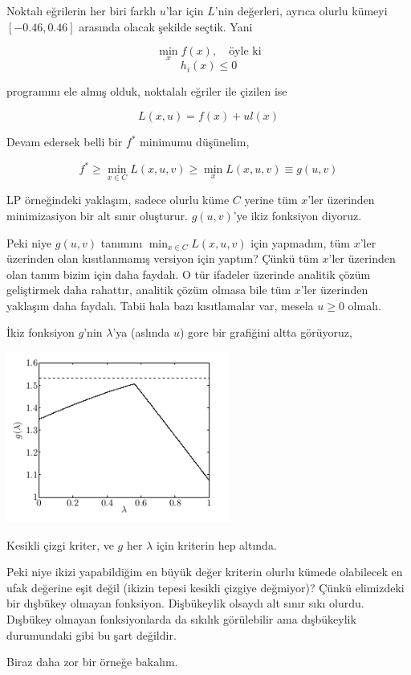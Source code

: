 \documentclass[12pt,fleqn]{article}\usepackage{../../common}
\begin{document}
Noktalı eğrilerin her biri farklı $u$'lar için $L$'nin değerleri, ayrıca
olurlu kümeyi $[-0.46,0.46]$ arasında olacak şekilde seçtik. Yani 

$$
\min_{x} f(x), \quad \textrm{öyle ki}
$$
$$
h_i(x) \le 0
$$

programını ele almış olduk, noktalalı eğriler ile çizilen ise 

$$
L(x,u) = f(x) + u l(x)
$$

Devam edersek belli bir $f^*$ minimumu düşünelim, 

$$
f^* \ge \min_{x \in C} L(x,u,v) \ge \min_x L(x,u,v) \equiv g(u,v)
$$ 

LP örneğindeki yaklaşım, sadece olurlu küme $C$ yerine tüm $x$'ler
üzerinden minimizasiyon bir alt sınır oluşturur. $g(u,v)$'ye ikiz fonksiyon
diyoruz.

Peki niye $g(u,v)$ tanımını $\min_{x \in C} L(x,u,v)$ için yapmadım, tüm
$x$'ler üzerinden olan kısıtlanmamış versiyon için yaptım? Çünkü tüm
$x$'ler üzerinden olan tanım bizim için daha faydalı. O tür ifadeler
üzerinde analitik çözüm geliştirmek daha rahattır, analitik çözüm olmasa
bile tüm $x$'ler üzerinden yaklaşım daha faydalı. Tabii hala bazı
kısıtlamalar var, mesela $u \ge 0$ olmalı.

İkiz fonksiyon $g$'nin $\lambda$'ya (aslında $u$) gore bir grafiğini altta görüyoruz,

\includegraphics[width=20em]{func_56_gendual_02.png}

Kesikli çizgi kriter, ve $g$ her $\lambda$ için kriterin hep altında.

Peki niye ikizi yapabildiğim en büyük değer kriterin olurlu kümede
olabilecek en ufak değerine eşit değil (ikizin tepesi kesikli çizgiye
değmiyor)? Çünkü elimizdeki bir dışbükey olmayan fonksiyon. Dişbükeylik
olsaydı alt sınır sıkı olurdu. Dışbükey olmayan fonksiyonlarda da sıkılık
görülebilir ama dışbükeylik durumundaki gibi bu şart değildir.

Biraz daha zor bir örneğe bakalım. 
\end{document}
